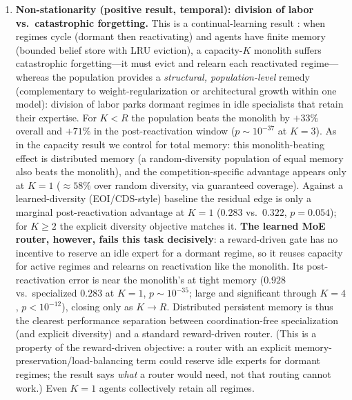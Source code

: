 \documentclass[11pt,a4paper]{article}
\theoremstyle{definition}
\theoremstyle{plain}
\begin{document}
\begin{enumerate}
    every $K$ ($\leq6\%$, $p{=}1$), though the lightweight competitive rule is more
    sample-efficient on noisy real data (beats the router on traffic $+5.1\%$ at
    $K{=}1$). A $K{=}1$ overlap sweep shows competition's edge over the diversity
    objective grows monotonically with method exclusivity ($-4.8\%$ at separation
    $0.25$ through $+29.3\%$ at separation $1.5$), pinning the claim's boundary.
    \item \textbf{Non-stationarity (positive result, temporal): division of labor
    vs.\ catastrophic forgetting.} This is a continual-learning result
    \cite{french1999catastrophic,kirkpatrick2017overcoming,parisi2019continual}:
    when regimes cycle (dormant then reactivating) and agents have finite memory
    (bounded belief store with LRU eviction), a capacity-$K$ monolith suffers
    catastrophic forgetting---it must evict and relearn each reactivated regime---
    whereas the population provides a \emph{structural, population-level} remedy
    (complementary to weight-regularization or architectural growth within one
    model): division of labor parks dormant regimes in idle specialists that retain
    their expertise. For $K{<}R$ the population beats the monolith
    by $+33\%$ overall and $+71\%$ in the post-reactivation window
    ($p\sim10^{-37}$ at $K{=}3$). As in the capacity result we control for total
    memory: this monolith-beating effect is distributed memory (a random-diversity
    population of equal memory also beats the monolith), and the
    competition-specific advantage appears only at $K{=}1$ ($\approx 58\%$ over
    random diversity, via guaranteed coverage). Against a learned-diversity
    (EOI/CDS-style) baseline the residual edge is only a marginal post-reactivation
    advantage at $K{=}1$ ($0.283$ vs.\ $0.322$, $p{=}0.054$); for $K\geq2$ the
    explicit diversity objective matches it. \textbf{The learned MoE router,
    however, fails this task decisively}: a reward-driven gate has no incentive to
    reserve an idle expert for a dormant regime, so it reuses capacity for active
    regimes and relearns on reactivation like the monolith. Its post-reactivation
    error is near the monolith's at tight memory ($0.928$ vs.\ specialized $0.283$
    at $K{=}1$, $p\sim10^{-35}$; large and significant through $K{=}4$,
    $p<10^{-12}$), closing only as $K\to R$. Distributed persistent memory is thus
    the clearest performance separation between coordination-free specialization
    (and explicit diversity) and a standard reward-driven router. (This is a
    property of the reward-driven objective: a router with an explicit
    memory-preservation/load-balancing term could reserve idle experts for dormant
    regimes; the result says \emph{what} a router would need, not that routing
    cannot work.) Even $K{=}1$ agents collectively retain all regimes.


\end{enumerate}
\end{document}
